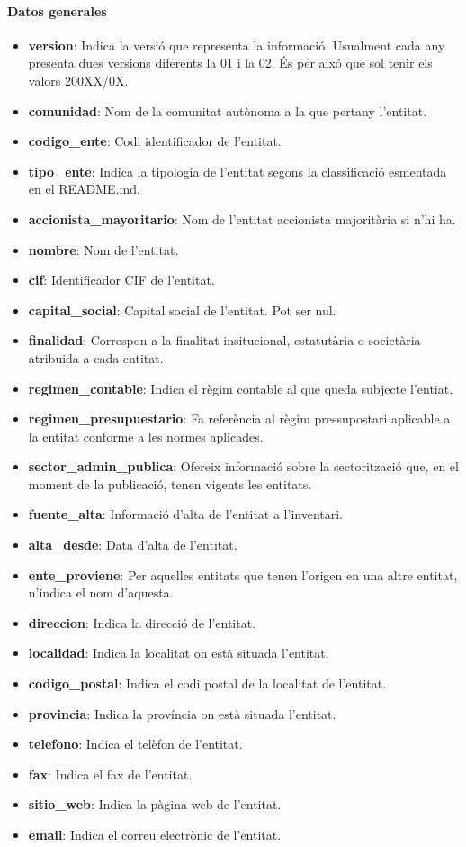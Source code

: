 \documentclass[12pt]{article}
\begin{document}
\paragraph{Datos generales\\}
\begin{itemize}
    \item \textbf{version}: Indica la versió que representa la informació. Usualment cada any presenta dues versions diferents la 01 i la 02. És per aixó que sol tenir els valors 200XX/0X.
    \item \textbf{comunidad}: Nom de la comunitat autònoma a la que pertany l'entitat.
    \item \textbf{codigo\_ente}: Codi identificador de l'entitat.
    \item \textbf{tipo\_ente}: Indica la tipología de l'entitat segons la classificació esmentada en el README.md.
    \item \textbf{accionista\_mayoritario}: Nom de l'entitat accionista majoritària si n'hi ha.
    \item \textbf{nombre}: Nom de l'entitat.
    \item \textbf{cif}: Identificador CIF de l'entitat.
    \item \textbf{capital\_social}: Capital social de l'entitat. Pot ser nul.
    \item \textbf{finalidad}: Correspon a la finalitat insitucional, estatutària o societària atribuida a cada entitat.
    \item \textbf{regimen\_contable}: Indica el règim contable al que queda subjecte l'entiat.
    \item \textbf{regimen\_presupuestario}: Fa referència al règim pressupostari aplicable a la entitat conforme a les normes aplicades.
    \item \textbf{sector\_admin\_publica}: Ofereix informació sobre la sectorització que, en el moment de la publicació, tenen vigents les entitats.
    \item \textbf{fuente\_alta}: Informació d'alta de l'entitat a l'inventari.
    \item \textbf{alta\_desde}: Data d'alta de l'entitat.
    \item \textbf{ente\_proviene}: Per aquelles entitats que tenen l'origen en una altre entitat, n'indica el nom d'aquesta.
    \item \textbf{direccion}: Indica la direcció de l'entitat.
    \item \textbf{localidad}: Indica la localitat on està situada l'entitat.
    \item \textbf{codigo\_postal}: Indica el codi postal de la localitat de l'entitat.
    \item \textbf{provincia}: Indica la província on està situada l'entitat.
    \item \textbf{telefono}: Indica el telèfon de l'entitat.
    \item \textbf{fax}: Indica el fax de l'entitat.
    \item \textbf{sitio\_web}: Indica la pàgina web de l'entitat.
    \item \textbf{email}:  Indica el correu electrònic de l'entitat.
\end{itemize}
\end{document}
